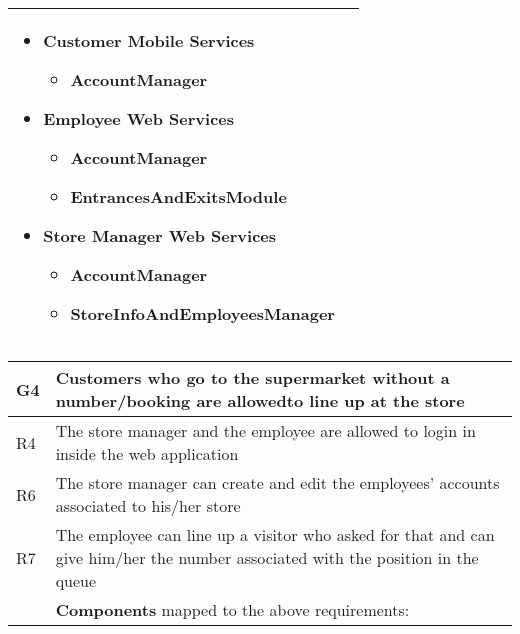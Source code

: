 \begin{center}
{\begin{longtable}{L{2.5cm}L{12cm}}
        \medskip
        \begin{itemize}
            \item Customer Mobile Services \begin{itemize}
                \item AccountManager
            \end{itemize}
            \item Employee Web Services \begin{itemize}
                \item AccountManager
                \item EntrancesAndExitsModule
            \end{itemize}
            \item Store Manager Web Services \begin{itemize}
                \item AccountManager
                \item StoreInfoAndEmployeesManager
            \end{itemize}
        \end{itemize} \\
        \hline
    \end{longtable}}

    {\renewcommand{\arraystretch}{1.5}
    \begin{longtable}{L{2.5cm}L{12cm}}
        \hline
        \textbf{G4} & \textbf{Customers who go to the supermarket without a number/booking are allowedto line up at the store} \\
        \hline
         R4 & The store manager and the employee are allowed to login in inside the web application \\
        \hline
         R6 & The store manager can create and edit the employees’ accounts associated to his/her store \\
        \hline
         R7 & The employee can line up a visitor who asked for that and can give him/her the number associated with the position in the queue \\
        \hline
         & \textbf{Components} mapped to the above requirements:


\end{longtable}}
\end{center}

